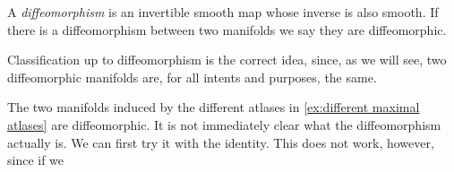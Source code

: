 \documentclass[12pt,oneside]{book}
\numberwithin{table}{section}
\numberwithin{equation}{section}
\numberwithin{figure}{section}
\begin{document}
\begin{defn}[Diffeomorphism]
	A \emph{diffeomorphism} is an invertible smooth map whose inverse is also smooth. If there is a diffeomorphism between two manifolds we say they are diffeomorphic.
\end{defn}

Classification up to diffeomorphism is the correct idea, since, as we will see, two diffeomorphic manifolds are, for all intents and purposes, the same.

\begin{exe}
	The two manifolds induced by the different atlases in \cref{ex:different maximal atlases} are diffeomorphic. It is not immediately clear what the diffeomorphism actually is. We can first try it with the identity. This does not work, however, since if we    
\end{exe}
\end{document}
